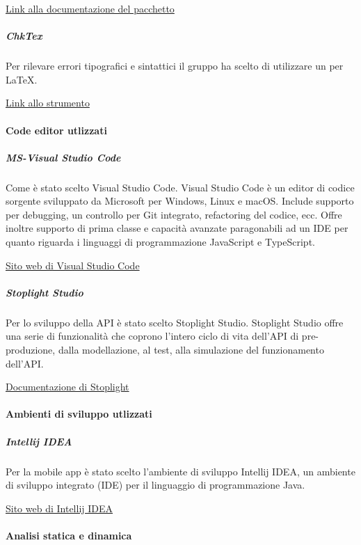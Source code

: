 \documentclass[../../norme-di-progetto.tex]{subfiles}
\begin{document}
\href{http://texdoc.net/texmf-dist/doc/latex/pgfgantt/pgfgantt.pdf}{Link alla documentazione del pacchetto}

\subparagraph{ChkTex}%
\label{subp:chktex}
Per rilevare errori tipografici e sintattici il gruppo ha scelto di utilizzare  un  per \LaTeX{}.

\href{https://www.nongnu.org/chktex/}{Link allo strumento}


\paragraph{Code editor utlizzati}%
\label{par:code_editor}

\subparagraph{MS-Visual Studio Code}%
\label{subp:vscode}
Come  è stato scelto Visual Studio Code.
Visual Studio Code è un editor di codice sorgente sviluppato da Microsoft per Windows, Linux e macOS. Include supporto per debugging, un controllo per Git integrato, refactoring del codice, ecc. Offre inoltre supporto di prima classe e capacità avanzate paragonabili ad un IDE per quanto riguarda i linguaggi di programmazione JavaScript e TypeScript.

\href{https://code.visualstudio.com/}{Sito web di Visual Studio Code}

\subparagraph{Stoplight Studio}%
\label{subp:stoplight_studio}
Per lo sviluppo della API è stato scelto Stoplight Studio.
Stoplight Studio offre una serie di funzionalità che coprono l'intero ciclo di vita dell'API di pre-produzione, dalla modellazione, al test, alla simulazione del funzionamento dell'API.

\href{https://stoplight.io/docs}{Documentazione di Stoplight}

\paragraph{Ambienti di sviluppo utlizzati}%
\label{par:ambienti_di_sviluppo}

\subparagraph{Intellij IDEA}%
\label{subp:intellij}
Per la mobile app è stato scelto l'ambiente di sviluppo Intellij IDEA, un ambiente di sviluppo integrato (IDE) per il linguaggio di programmazione Java.

\href{https://www.jetbrains.com/idea/}{Sito web di Intellij IDEA}

\paragraph{Analisi statica e dinamica}%
\label{par:analisi_statica_e_dinamica}
\end{document}
